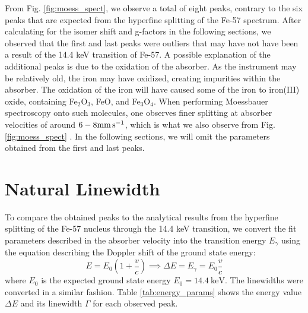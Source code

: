 \documentclass[a4paper]{report}
\numberwithin{equation}{section}
\begin{document}

From Fig. \ref{fig:moess_spect}, we observe a total of eight peaks, contrary to the 
six peaks that are expected from the hyperfine splitting of the Fe-57 spectrum. After calculating for the isomer shift and 
g-factors in the following sections, we observed that the first and last peaks were outliers that may have not have been a result of  
 the 14.4 keV transition of Fe-57. 
A possible explanation of the additional peaks is due to the oxidation of the absorber. As the instrument may be relatively old,
the iron may have oxidized, creating impurities within the absorber. The oxidation of the iron will have caused some of the iron
to iron(III) oxide, containing Fe$_2$O$_3$, FeO, and Fe$_3$O$_4$. When performing Moessbauer spectroscopy onto such molecules, 
one observes finer splitting at absorber velocities of around $6-8\si[]{\milli\metre\per\second}$, which is what we also 
observe from Fig. \ref{fig:moess_spect} \cite{Winsett2019}. In the following sections, we will omit the parameters obtained from 
the first and last peaks. \par 

\section{Natural Linewidth}

To compare the obtained peaks to the analytical results from the hyperfine splitting of the Fe-57 nucleus through the 14.4 keV
transition, we convert the fit parameters described in the absorber velocity into the transition energy $E_\gamma$ using the 
equation describing the Doppler shift of the ground state energy: 
\begin{equation}
    E = E_0 \left(1 + \frac{v}{c}\right) \implies \Delta E = E_\gamma = E_0\frac{v}{c}
\end{equation}
where $E_0$ is the expected ground state energy $E_0 = \SI{14.4}{\kilo\electronvolt}$. The linewidths were converted in a similar 
fashion. Table \ref{tab:energy_params} shows the energy value $\Delta E$ and its 
linewidth $\Gamma$ for each observed peak. 
\end{document}
